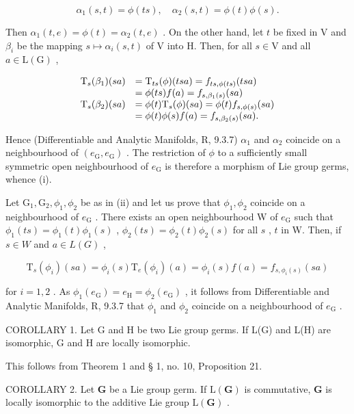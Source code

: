 \[
\alpha_ {1} (s, t) = \phi (t s), \quad \alpha_ {2} (s, t) = \phi (t) \phi (s).
\]

Then \(\alpha_{1}(t,e) = \phi (t) = \alpha_{2}(t,e)\) . On the other hand, let \(t\) be fixed in V and \(\beta_{i}\) be the mapping \(s\mapsto \alpha_i(s,t)\) of V into H. Then, for all \(s\in \mathrm{V}\) and all \(a\in \mathrm{L}(\mathrm{G})\) ,

\[
\begin{array}{r l} \mathrm{T} _ {s} (\beta_ {1}) (s a) & = \mathrm{T} _ {t s} (\phi) (t s a) = f _ {t s, \phi (t s)} (t s a) \\ & = \phi (t s) f (a) = f _ {s, \beta_ {1} (s)} (s a) \\ \mathrm{T} _ {s} (\beta_ {2}) (s a) & = \phi (t) \mathrm{T} _ {s} (\phi) (s a) = \phi (t) f _ {s, \phi (s)} (s a) \\ & = \phi (t) \phi (s) f (a) = f _ {s, \beta_ {2} (s)} (s a). \end{array}
\]

Hence (Differentiable and Analytic Manifolds, R, 9.3.7) \(\alpha_{1}\) and \(\alpha_{2}\) coincide on a neighbourhood of \((e_{\mathrm{G}}, e_{\mathrm{G}})\) . The restriction of \(\phi\) to a sufficiently small symmetric open neighbourhood of \(e_{\mathrm{G}}\) is therefore a morphism of Lie group germs, whence (i).

Let \(\mathrm{G}_1, \mathrm{G}_2, \phi_1, \phi_2\) be as in (ii) and let us prove that \(\phi_1, \phi_2\) coincide on a neighbourhood of \(e_{\mathrm{G}}\) . There exists an open neighbourhood W of \(e_{\mathrm{G}}\) such that \(\phi_1(t s) = \phi_1(t)\phi_1(s)\) , \(\phi_2(t s) = \phi_2(t)\phi_2(s)\) for all \(s\) , \(t\) in W. Then, if \(s \in W\) and \(a \in L(G)\) ,

\[
\mathrm{T} _ {s} \left(\phi_ {i}\right) (s a) = \phi_ {i} (s) \mathrm{T} _ {e} \left(\phi_ {i}\right) (a) = \phi_ {i} (s) f (a) = f _ {s, \phi _ {i} (s)} (s a)
\]

for \(i = 1,2\) . As \(\phi_1(e_{\mathrm{G}}) = e_{\mathrm{H}} = \phi_2(e_{\mathrm{G}})\) , it follows from Differentiable and Analytic Manifolds, R, 9.3.7 that \(\phi_1\) and \(\phi_2\) coincide on a neighbourhood of \(e_{\mathrm{G}}\) .

COROLLARY 1. Let G and H be two Lie group germs. If L(G) and L(H) are isomorphic, G and H are locally isomorphic.

This follows from Theorem 1 and § 1, no. 10, Proposition 21.

COROLLARY 2. Let \(\mathbf{G}\) be a Lie group germ. If \(\mathrm{L}(\mathbf{G})\) is commutative, \(\mathbf{G}\) is locally isomorphic to the additive Lie group \(\mathrm{L}(\mathbf{G})\) .

